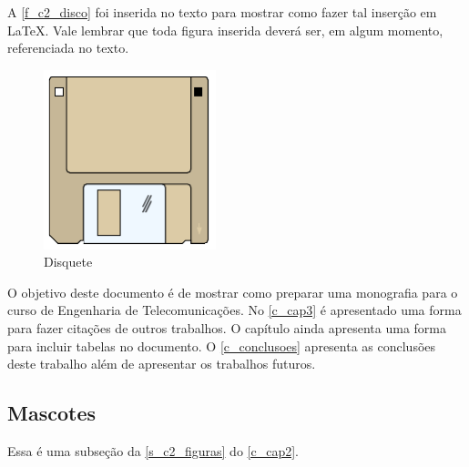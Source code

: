A \autoref{f_c2_disco} foi inserida no texto para mostrar como fazer tal inserção em \LaTeX. Vale lembrar que toda figura inserida deverá ser, em algum momento, referenciada no texto. 

\begin{figure}[!htpb]
	\centering
	\caption{Disquete}\label{f_c2_disco}
	\includegraphics[width=5cm]{figs/disco}
\end{figure}

O objetivo deste documento é de mostrar como preparar uma monografia para o curso de Engenharia de Telecomunicações. No \autoref{c_cap3} é apresentado uma forma para fazer citações de outros trabalhos. O capítulo ainda apresenta uma forma para incluir tabelas no documento. O \autoref{c_conclusoes} apresenta as conclusões deste trabalho além de apresentar os trabalhos futuros.

\subsection{Mascotes}
\label{s_c2_mascotes}

Essa é uma subseção da \autoref{s_c2_figuras} do \autoref{c_cap2}. 


